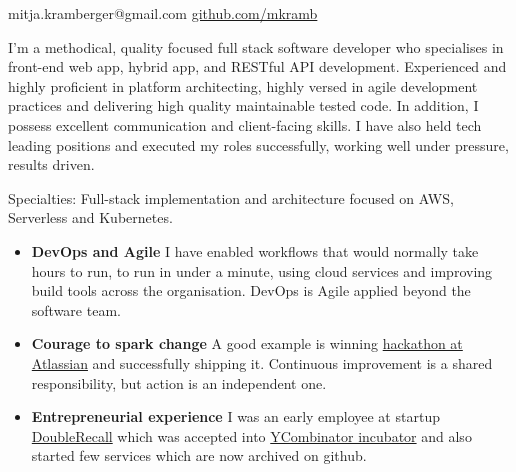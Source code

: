 \documentclass[10pt,a4paper]{article}
\begin{document}
\sloppy  %


\nobreakvspace{0.3em}  %

\noindent
mitja.kramberger@gmail.com\sbull
\href{http://github.com/mkramb}{github.com/mkramb}


\spacedhrule{0.9em}{-0.4em}  %
\vspace{-0em}  %

\noindent I'm a methodical, quality­ focused full stack software developer who specialises in front-end web app, hybrid app, and RESTful API development. 
\noindent Experienced and highly proficient in platform architecting, highly versed in agile development practices and delivering high quality maintainable tested code. 
\noindent In addition, I possess excellent communication and client-facing skills. I have also held tech leading positions and executed my roles successfully, working well under pressure, results driven.

\inlineheadsection  %
  {Specialties:}
  {Full-stack implementation and architecture focused on AWS, Serverless and Kubernetes.}

\spacedhrule{1.5em}{-0.4em}



\begin{indentsection}
\item
\begin{itemize}[leftmargin=0cm]
    \item \textbf{DevOps and Agile} I have enabled workflows that would normally take hours to run, to run in under a minute, using cloud services and improving build tools across the organisation. DevOps is Agile applied beyond the software team.
    \item \textbf{Courage to spark change} A good example is winning {\href{https://youtu.be/gdmrfGAZB0g?t=415}{hackathon at Atlassian}} and successfully shipping it. Continuous improvement is a shared responsibility, but action is an independent one. 
    \item \textbf{Entrepreneurial experience} I was an early employee at startup {\href{https://www.linkedin.com/company/doublerecall}{DoubleRecall}} which was accepted into {\href{https://www.ycombinator.com/}{YCombinator incubator}}
    and also started few services which are now archived on github.
\end{itemize}
\end{indentsection}
\end{document}
